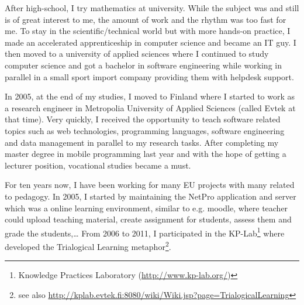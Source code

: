 After high-school, I try mathematics at university. While the subject was and still is of great interest to me, the amount of work and the rhythm was too fast for me. 
To stay in the scientific/technical world but with more hands-on practice, I made an accelerated apprenticeship in computer science and became an IT guy. 
I then moved to a university of applied sciences where I continued to study computer science and got a bachelor in software engineering while working in parallel in a small sport import company providing them with helpdesk support.

In 2005, at the end of my studies, I moved to Finland where I started to work as a research engineer in Metropolia University of Applied Sciences (called Evtek at that time). 
Very quickly, I received the opportunity to teach software related topics such as web technologies, programming languages, software engineering and data management in parallel to my research tasks. 
After completing my master degree in mobile programming last year and with the hope of getting a lecturer position, vocational studies became a must.

For ten years now, I have been working for many EU projects with many related to pedagogy. 
In 2005, I started by maintaining the NetPro application and server which was a online learning environment, similar to e.g. moodle, where teacher could upload teaching material, create assignment for students, assess them and grade the students,\ldots
From 2006 to 2011, I participated in the KP-Lab\footnote{Knowledge Practices Laboratory (\url{http://www.kp-lab.org/})} where \citeauthor{Paavola_2005} \cite{Paavola_2005} developed the Trialogical Learning metaphor\footnote{see also \url{http://kplab.evtek.fi:8080/wiki/Wiki.jsp?page=TrialogicalLearning}}.





  
  
  